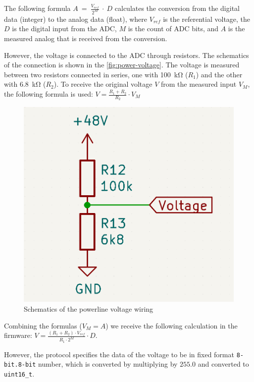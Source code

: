\documentclass[
  digital,     %
  oneside,     %
  nosansbold,  %
  nocolorbold, %
  nolof,         %
  nolot,         %
]{fithesis4}
\begin{document}
{{{The following formula $A~=~\frac{V_{ref}}{2^{M}}~\cdot~D$ calculates the conversion from the digital data (integer) to the analog data (float), where $V_{ref}$ is the referential voltage, the $D$ is the digital input from the ADC, $M$ is the count of ADC bits, and $A$ is the measured analog that is received from the conversion.

However, the voltage is connected to the ADC through resistors. The schematics of the connection is shown in the \autoref{fig:power-voltage}. The voltage is measured between two resistors connected in series, one with \qty{100}{\kilo\ohm} ($R_1$) and the other with \qty{6.8}{\kilo\ohm} ($R_2$). To receive the original voltage $V$ from the measured input $V_M$, the following formula is used: $V = \frac{R_1 + R_2}{R_2} \cdot V_{M}$

\begin{figure}
    \includegraphics[scale=0.2,keepaspectratio]{assets/power-voltage.png}
    \caption{ Schematics of the powerline voltage wiring }
    \label{fig:power-voltage}
\end{figure}

Combining the formulas ($V_M = A$) we receive the following calculation in the firmware: $V = \frac{(R_1 + R_2) \cdot V_{ref}}{R_1 \cdot 2^{M}} \cdot D$.

However, the protocol specifies the data of the voltage to be in fixed format \verb|8-bit.8-bit| number, which is converted by multiplying by $255.0$ and converted to \lstinline|uint16_t|.

}}}
\end{document}
